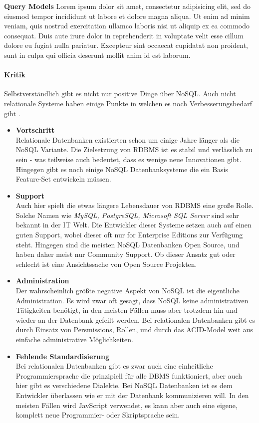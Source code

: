 \tab\textbf{Query Models}
Lorem ipsum dolor sit amet, consectetur adipisicing elit, sed do eiusmod
tempor incididunt ut labore et dolore magna aliqua. Ut enim ad minim veniam,
quis nostrud exercitation ullamco laboris nisi ut aliquip ex ea commodo
consequat. Duis aute irure dolor in reprehenderit in voluptate velit esse
cillum dolore eu fugiat nulla pariatur. Excepteur sint occaecat cupidatat non
proident, sunt in culpa qui officia deserunt mollit anim id est laborum.

\paragraph{Kritik\newline}
Selbstverständlich gibt es nicht nur positive Dinge über NoSQL. Auch nicht relationale Systeme haben einige Punkte in welchen es noch Verbesserungsbedarf gibt \cite{MELD.CH2-noSQL.sqlvsnosql}. 

\begin{itemize}
	\item \textbf{Vortschritt\\}
	Relationale Datenbanken existierten schon um einige Jahre länger als die NoSQL Variante. Die Zielsetzung von RDBMS ist es stabil und verlässlich zu sein - was teilweise auch bedeutet, dass es wenige neue Innovationen gibt. Hingegen gibt es noch einige NoSQL Datenbanksysteme die ein Basis Feature-Set entwickeln müssen.

	\item \textbf{Support\\}
	Auch hier spielt die etwas längere Lebensdauer von RDBMS eine große Rolle. Solche Namen wie \textit{MySQL, PostgreSQL, Microsoft SQL Server} sind sehr bekannt in der IT Welt. Die Entwickler dieser Systeme setzen auch auf einen guten Support, wobei dieser oft nur for Enterprise Editions zur Verfügung steht. Hingegen sind die meisten NoSQL Datenbanken Open Source, und haben daher meist nur Community Support. Ob dieser Ansatz gut oder schlecht ist eine Ansichtssache von Open Source Projekten.

	\item \textbf{Administration\\}
	Der wahrscheinlich größte negative Aspekt von NoSQL ist die eigentliche Administration. Es wird zwar oft gesagt, dass NoSQL keine administrativen Tätigkeiten benötigt, in den meisten Fällen muss aber trotzdem hin und wieder an der Datenbank gefeilt werden. Bei relationalen Datenbanken gibt es durch Einsatz von Persmissions, Rollen, und durch das ACID-Model weit aus einfache administrative Möglichkeiten.

	\item \textbf{Fehlende Standardisierung\\}
	Bei relationalen Datenbanken gibt es zwar auch eine einheitliche Programmiersprache die prinzipiell für alle DBMS funktioniert, aber auch hier gibt es verschiedene Dialekte. Bei NoSQL Datenbanken ist es dem Entwickler überlassen wie er mit der Datenbank kommunizieren will. In den meisten Fällen wird JavScript verwendet, es kann aber auch eine eigene, komplett neue Programmier- oder Skriptsprache sein.
\end{itemize}


